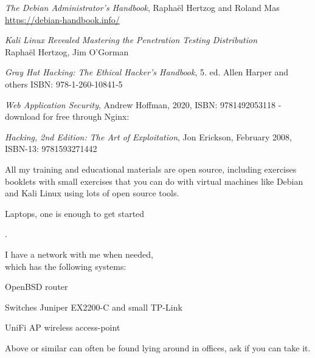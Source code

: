 \documentclass[Screen16to9,17pt]{foils}
\begin{document}
\begin{list2}
\item \emph{The Debian Administrator’s Handbook}, Raphaël Hertzog and Roland Mas\\
\url{https://debian-handbook.info/}
\item \emph{Kali Linux Revealed  Mastering the Penetration Testing Distribution}\\
Raphaël Hertzog, Jim O'Gorman\\

\item \emph{Gray Hat Hacking: The Ethical Hacker's Handbook}, 5. ed. Allen Harper and others ISBN: 978-1-260-10841-5
\item \emph{Web Application Security}, Andrew Hoffman, 2020, ISBN: 9781492053118 - download for free through Nginx:\\

\item \emph{Hacking, 2nd Edition: The Art of Exploitation}, Jon Erickson, February 2008, ISBN-13: 9781593271442
\item All my training and educational materials are open source, including exercises booklets with small exercises that you can do with virtual machines like Debian and Kali Linux using lots of open source tools.\\
{\bf {}}
\end{list2}





Laptops, one is enough to get started

.

\begin{list1}
\item I have a network with me when needed, \\
which has the following systems:
\begin{list2}
\item OpenBSD router
\item Switches Juniper EX2200-C and small TP-Link
\item UniFi AP wireless access-point
\end{list2}
\end{list1}

Above or similar can often be found lying around in offices, ask if you can take it.
\end{document}
